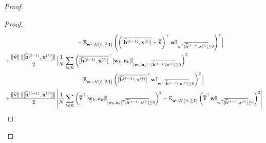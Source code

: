 \begin{proof}
\begin{proof}
\begin{align}
			&\quad\quad\quad\quad\quad\quad\quad\quad\quad\quad\quad\quad\quad - \mathbb{E}_{\mathbf{w} \sim \mathcal{N}\left(0, \frac{2}{m}\mathbf{I}\right)} \left(\left(\overline{[\widetilde{\mathbf{h}}^{(\ell-1)},  \mathbf{x}^{(\ell)}]} + \overline{\widetilde{\mathbf{v}}}\right)^{\top} \mathbf{w} \mathbb{I}_{\mathbf{w}^{\top} \overline{[\widetilde{\mathbf{h}}^{(\ell-1)},  \mathbf{x}^{(\ell)}]} \ge 0} \right)^2\Big| \label{eqn:bernstein_xl_v}
			\\&  + \frac{\norm{\widetilde{\mathbf{v}}} \norm[0]{[\widetilde{\mathbf{h}}^{(\ell-1)},  \mathbf{x}^{(\ell)}]}}{2}\Big| \frac{1}{N}\sum_{k \in \mathcal{K}} \left(\overline{[\widetilde{\mathbf{h}}^{(\ell-1)},  \mathbf{x}^{(\ell)}]}^{\top} [\mathbf{w}_{k}, \mathbf{a}_{k}] \mathbb{I}_{[\mathbf{w}_{k}, \mathbf{a}_{k}]^{\top} \overline{[\widetilde{\mathbf{h}}^{(\ell-1)},  \mathbf{x}^{(\ell)}]} \ge 0} \right)^2  \nonumber \\&\quad\quad\quad\quad\quad\quad\quad\quad\quad\quad\quad\quad\quad - \mathbb{E}_{\mathbf{w} \sim \mathcal{N}\left(0, \frac{2}{m}\mathbf{I}\right)} \left(\overline{[\widetilde{\mathbf{h}}^{(\ell-1)},  \mathbf{x}^{(\ell)}]}^{\top} \mathbf{w} \mathbb{I}_{\mathbf{w}^{\top} \overline{[\widetilde{\mathbf{h}}^{(\ell-1)},  \mathbf{x}^{(\ell)}]} \ge 0} \right)^2\Big| \label{eqn:bernstein_xl}\\
			&  + \frac{\norm{\widetilde{\mathbf{v}}} \norm[0]{[\widetilde{\mathbf{h}}^{(\ell-1)},  \mathbf{x}^{(\ell)}]}}{2} \abs{\frac{1}{N}\sum_{k \in \mathcal{K}}  \left(\overline{\widetilde{\mathbf{v}}}^{\top} [\mathbf{w}_{k}, \mathbf{a}_{k}] \mathbb{I}_{[\mathbf{w}_{k}, \mathbf{a}_{k}]^{\top} \overline{[\widetilde{\mathbf{h}}^{(\ell-1)},  \mathbf{x}^{(\ell)}]} \ge 0} \right)^2 - \mathbb{E}_{\mathbf{w} \sim \mathcal{N}\left(0, \frac{2}{m}\mathbf{I}\right)} \left(\overline{\widetilde{\mathbf{v}}}^{\top} \mathbf{w} \mathbb{I}_{\mathbf{w}^{\top} \overline{[\widetilde{\mathbf{h}}^{(\ell-1)},  \mathbf{x}^{(\ell)}]} \ge 0} \right)^2} \label{eqn:bernstein_v}
		\end{align}
		\endgroup
		

\end{proof}
\end{proof}
